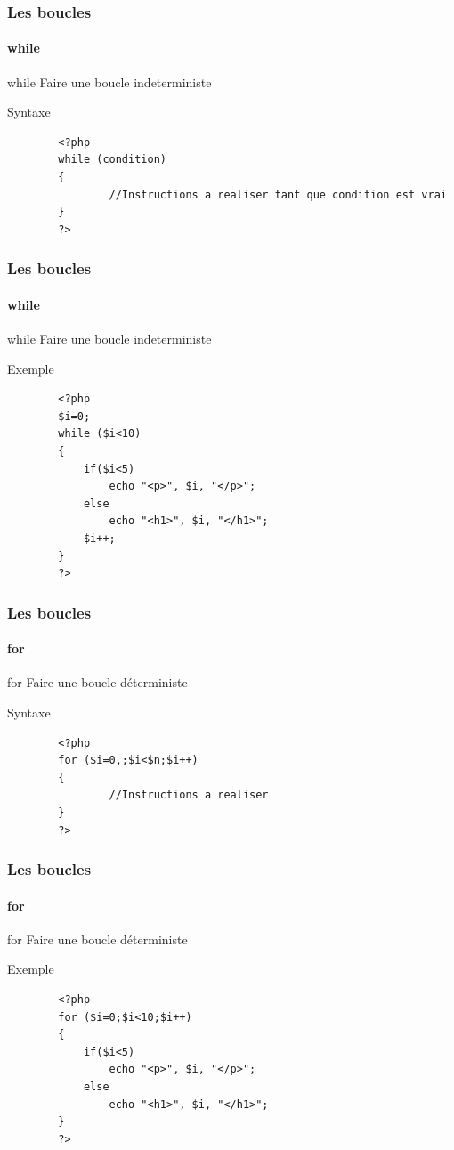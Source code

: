 \documentclass[handout]{beamer}
\begin{document}
\begin{frame}[fragile]
	\frametitle{Les boucles}
	\framesubtitle{while}
	\begin{block}{while}
		Faire une boucle indeterministe
	\end{block}

	\begin{alertblock}{Syntaxe}
	\begin{verbatim}
		<?php
		while (condition)
		{
				//Instructions a realiser tant que condition est vrai
		}
		?>
	\end{verbatim}
	\end{alertblock}
\end{frame}

\begin{frame}[fragile]
	\frametitle{Les boucles}
	\framesubtitle{while}
	\begin{block}{while}
		Faire une boucle indeterministe
	\end{block}

	\begin{exampleblock}{Exemple}
	\begin{verbatim}
		<?php
		$i=0;
		while ($i<10)
		{
			if($i<5)
				echo "<p>", $i, "</p>";
			else
				echo "<h1>", $i, "</h1>";
			$i++;
		}
		?>
	\end{verbatim}
	\end{exampleblock}
\end{frame}

\begin{frame}[fragile]
	\frametitle{Les boucles}
	\framesubtitle{for}
	\begin{block}{for}
		Faire une boucle déterministe
	\end{block}

	\begin{alertblock}{Syntaxe}
	\begin{verbatim}
		<?php
		for ($i=0,;$i<$n;$i++)
		{
				//Instructions a realiser
		}
		?>
	\end{verbatim}
	\end{alertblock}
\end{frame}

\begin{frame}[fragile]
	\frametitle{Les boucles}
	\framesubtitle{for}
	\begin{block}{for}
		Faire une boucle déterministe
	\end{block}

	\begin{exampleblock}{Exemple}
	\begin{verbatim}
		<?php
		for ($i=0;$i<10;$i++)
		{
			if($i<5)
				echo "<p>", $i, "</p>";
			else
				echo "<h1>", $i, "</h1>";
		}
		?>
	\end{verbatim}
	\end{exampleblock}
\end{frame}
\end{document}
